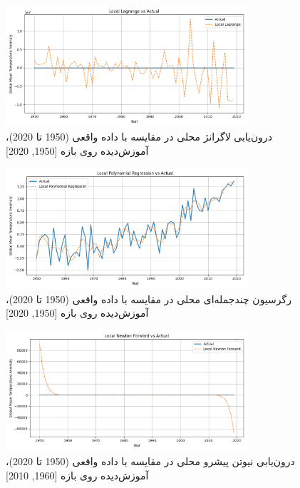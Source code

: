 \begin{figure}[htbp]
    \centering
    \includegraphics[width=0.8\textwidth]{../figs/Local_Lagrange_vs_actual[1950, 2020, 1].png}
    \caption{درون‌یابی لاگرانژ محلی در مقایسه با داده واقعی (1950 تا 2020)، آموزش‌دیده روی بازه [1950, 2020]}
    \label{fig:lagrange}
\end{figure}

\begin{figure}[htbp]
    \centering
    \includegraphics[width=0.8\textwidth]{../figs/Local_Polynomial_Regression_vs_actual[1950, 2020, 1].png}
    \caption{رگرسیون چندجمله‌ای محلی در مقایسه با داده واقعی (1950 تا 2020)، آموزش‌دیده روی بازه [1950, 2020]}
    \label{fig:regression}
\end{figure}

\begin{figure}[htbp]
    \centering
    \includegraphics[width=0.8\textwidth]{../figs/Local_Newton_Forward_vs_actual[1960, 2010, 1].png}
    \caption{درون‌یابی نیوتن پیشرو محلی در مقایسه با داده واقعی (1950 تا 2020)، آموزش‌دیده روی بازه [1960, 2010]}
    \label{fig:forward2}
\end{figure}

